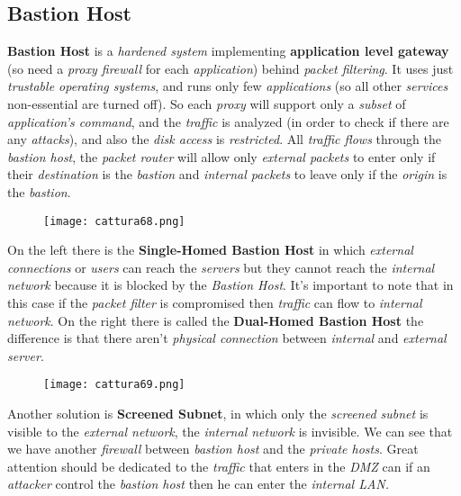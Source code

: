 \documentclass{article}
\begin{document}
\subsection{Bastion Host}
\textbf{Bastion Host} is a \emph{hardened system} implementing \textbf{application level gateway} (so need a \emph{proxy firewall} for each \emph{application}) behind \emph{packet filtering}. It uses just \emph{trustable operating systems}, and runs only few \emph{applications} (so all other \emph{services} non-essential are turned off). So each \emph{proxy} will support only a \emph{subset} of \emph{application's command}, and the \emph{traffic} is analyzed (in order to check if there are any \emph{attacks}), and also the \emph{disk access} is \emph{restricted}. All \emph{traffic flows} through the \emph{bastion host}, the \emph{packet router} will allow only \emph{external packets} to enter only if their \emph{destination} is the \emph{bastion} and \emph{internal packets} to leave only if the \emph{origin} is the \emph{bastion}. 
\begin{figure}[H]
  \centering
  \texttt{[image: cattura68.png]}
\end{figure}
On the left there is the \textbf{Single-Homed Bastion Host} in which \emph{external connections} or \emph{users} can reach the \emph{servers} but they cannot reach the \emph{internal network} because it is blocked by the \emph{Bastion Host}. It's important to note that in this case if the \emph{packet filter} is compromised then \emph{traffic} can flow to \emph{internal network}. On the right there is called the \textbf{Dual-Homed Bastion Host} the difference is that there aren't \emph{physical connection} between \emph{internal} and \emph{external server}. 
\begin{figure}[H]
  \centering
  \texttt{[image: cattura69.png]}
\end{figure}
Another solution is \textbf{Screened Subnet}, in which only the \emph{screened subnet} is visible to the \emph{external network}, the \emph{internal network} is invisible. We can see that we have another \emph{firewall} between \emph{bastion host} and the \emph{private hosts}. Great attention should be dedicated to the \emph{traffic} that enters in the \emph{DMZ} can if an \emph{attacker} control the \emph{bastion host} then he can enter the \emph{internal LAN. }
\end{document}
